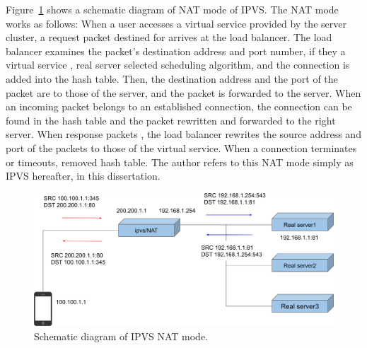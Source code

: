Figure~\ref{fig:ipvs-nat-schem} shows a schematic diagram of NAT mode of IPVS.
The NAT mode works as follows: When a user accesses a virtual service provided by the server cluster, a request packet destined for  arrives at the load balancer.
The load balancer examines the packet's destination address and port number, if they  a virtual service ,  real server selected  scheduling algorithm, and  the connection is added into the  hash table. 
Then, the destination  address and the port  of the  packet are  to those of the  server, and the packet is forwarded to the  server. 
When an incoming packet belongs to an established connection, the connection can be found in the hash table and the packet  rewritten and forwarded to the right server. 
When response packets , the load balancer rewrites the source address and port  of the packets to those of the virtual service.
When a connection terminates or timeouts,  removed  hash table.
%
The author refers to this NAT mode simply as IPVS hereafter, in this dissertation.

\begin{figure}[h]
  \centering
  \includegraphics[width=0.9\columnwidth]{Figs/ipvs-nat-schem}

  \par\bigskip
  \centering
  \begin{minipage}{0.9\columnwidth}
    \caption[IPVS NAT mode]{
      Schematic diagram of IPVS NAT mode.
    }
    \label{fig:ipvs-nat-schem}
  \end{minipage}
\end{figure}

